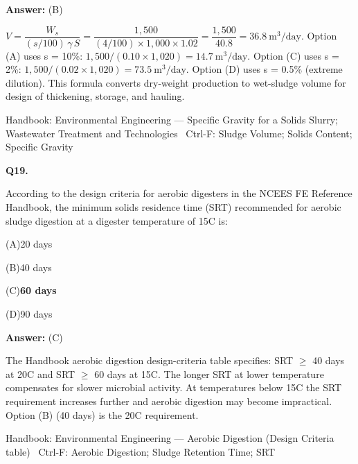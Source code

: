 \documentclass[11pt]{article}
\newcommand{\correct}[1]{\textbf{#1}\;{\color{accent}$\checkmark$}}
\newcommand{\optline}[2]{\par\noindent\hspace{1.2em}(#1)\hspace{0.6em}#2}
\begin{document}
\vspace{2pt}\par\noindent\colorbox{boxbg}{\parbox{\dimexpr\linewidth-2\fboxsep\relax}{%
\vspace{2pt}\textbf{Answer:} (B)\par\vspace{2pt}
{\small $V = \dfrac{W_s}{(s/100)\,\gamma\,S} = \dfrac{1{,}500}{(4/100)\times1{,}000\times1.02} = \dfrac{1{,}500}{40.8} = 36.8\ \mathrm{m^3/day}$. Option (A) uses s = 10\%: $1{,}500/(0.10\times1{,}020) = 14.7\ \mathrm{m^3/day}$. Option (C) uses s = 2\%: $1{,}500/(0.02\times1{,}020) = 73.5\ \mathrm{m^3/day}$. Option (D) uses s = 0.5\% (extreme dilution). This formula converts dry-weight production to wet-sludge volume for design of thickening, storage, and hauling.}\par\vspace{2pt}
{\footnotesize\color{soft}Handbook: Environmental Engineering --- Specific Gravity for a Solids Slurry; Wastewater Treatment and Technologies \textbullet\ Ctrl-F: Sludge Volume; Solids Content; Specific Gravity}\vspace{2pt}
}}
\vspace{9pt}
\filbreak
\textbf{\color{accent}Q19.}\par\vspace{2pt}
According to the design criteria for aerobic digesters in the NCEES FE Reference Handbook, the minimum solids residence time (SRT) recommended for aerobic sludge digestion at a digester temperature of 15\textdegree{}C is:\par\vspace{3pt}
\optline{A}{20 days}
\optline{B}{40 days}
\optline{C}{\correct{60 days}}
\optline{D}{90 days}
\par\vspace{3pt}
\vspace{2pt}\par\noindent\colorbox{boxbg}{\parbox{\dimexpr\linewidth-2\fboxsep\relax}{%
\vspace{2pt}\textbf{Answer:} (C)\par\vspace{2pt}
{\small The Handbook aerobic digestion design-criteria table specifies: SRT $\ge$ 40 days at 20\textdegree{}C and SRT $\ge$ 60 days at 15\textdegree{}C. The longer SRT at lower temperature compensates for slower microbial activity. At temperatures below 15\textdegree{}C the SRT requirement increases further and aerobic digestion may become impractical. Option (B) (40 days) is the 20\textdegree{}C requirement.}\par\vspace{2pt}
{\footnotesize\color{soft}Handbook: Environmental Engineering --- Aerobic Digestion (Design Criteria table) \textbullet\ Ctrl-F: Aerobic Digestion; Sludge Retention Time; SRT}\vspace{2pt}
}}
\end{document}
